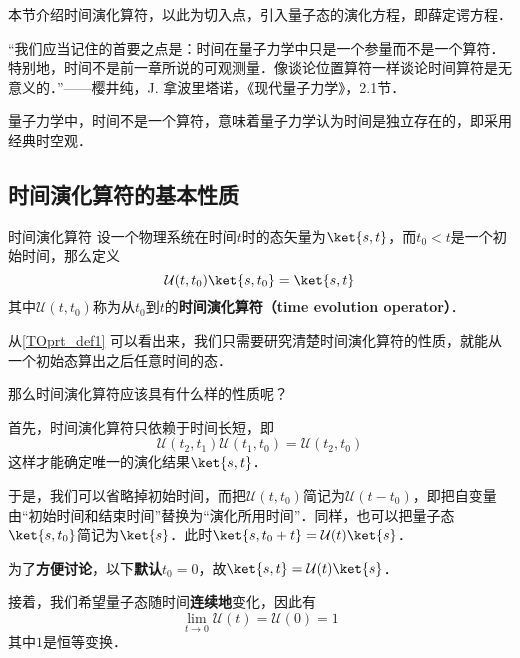 



本节介绍时间演化算符，以此为切入点，引入量子态的演化方程，即薛定谔方程．


“我们应当记住的首要之点是：时间在量子力学中只是一个参量而不是一个算符．特别地，时间不是前一章所说的可观测量．像谈论位置算符一样谈论时间算符是无意义的．”——樱井纯，J. 拿波里塔诺，《现代量子力学》，2.1节．

量子力学中，时间不是一个算符，意味着量子力学认为时间是独立存在的，即采用经典时空观．


\subsection{时间演化算符的基本性质}

\begin{definition}{时间演化算符}\label{TOprt_def1}
设一个物理系统在时间$t$时的态矢量为$\ket{s, t}$，而$t_0<t$是一个初始时间，那么定义
\begin{equation}\label{TOprt_eq1}
\mathcal{U}(t, t_0)\ket{s, t_0}=\ket{s, t}
\end{equation}
其中$\mathcal{U}(t, t_0)$称为从$t_0$到$t$的\textbf{时间演化算符（time evolution operator）}．
\end{definition}

从\autoref{TOprt_def1} 可以看出来，我们只需要研究清楚时间演化算符的性质，就能从一个初始态算出之后任意时间的态．

那么时间演化算符应该具有什么样的性质呢？


首先，时间演化算符只依赖于时间长短，即
\begin{equation}\label{TOprt_eq2}
\mathcal{U}(t_2, t_1)\mathcal{U}(t_1, t_0) = \mathcal{U}(t_2, t_0)
\end{equation}
这样才能确定唯一的演化结果$\ket{s, t}$．

于是，我们可以省略掉初始时间，而把$\mathcal{U}(t, t_0)$简记为$\mathcal{U}(t-t_0)$，即把自变量由“初始时间和结束时间”替换为“演化所用时间”．同样，也可以把量子态$\ket{s, t_0}$简记为$\ket{s}$．此时$\ket{s, t_0+t}=\mathcal{U}(t)\ket{s}$．

为了\textbf{方便讨论}，以下\textbf{默认}$t_0=0$，故$\ket{s, t}=\mathcal{U}(t)\ket{s}$．

接着，我们希望量子态随时间\textbf{连续地}变化，因此有
\begin{equation}\label{TOprt_eq3}
\lim_{t\to 0}\mathcal{U}(t) = \mathcal{U}(0) = 1
\end{equation}
其中$1$是恒等变换．

